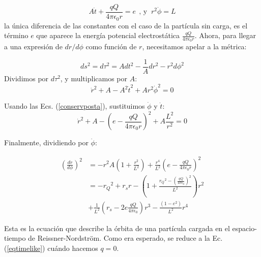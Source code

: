 \begin{equation}
    A\dot{t} + \frac{qQ}{4\pi\epsilon_0 r} = e\ \ \text{, y }\ r^2 \dot{\phi} = L
\label{conservposta}
\end{equation}
la única diferencia de las constantes con el caso de la partícula sin carga, es el término $e$ que aparece la energía potencial electrostática $\frac{qQ}{4\pi\epsilon_0 r}$. Ahora, para llegar a una expresión de $dr/d\phi$ como función de $r$, necesitamos apelar a la métrica:

\begin{equation}
    ds^2=d\tau^2=Adt^2 - \frac{1}{A}dr^2- r^2d\phi^2
\end{equation}
Dividimos por $d\tau^2$, y multiplicamos por $A$:
\begin{equation}
    \dot{r}^2 + A - A^2 \dot{t}^2 + A r^2 \dot{\phi}^2 =0
\end{equation}

Usando las Ecs. (\ref{conservposta}), sustituimos $\dot{\phi}$ y $\dot{t}$:
\begin{equation}
    \dot{r}^2 + A - \left(e-\frac{qQ}{4\pi\epsilon_0 r}\right)^2 + A \frac{L^2}{r^2} =0
\end{equation}

Finalmente, dividiendo por $\dot{\phi}$:

\begin{equation}
\begin{split}
    \left( \frac{dr}{d\phi} \right)^2 &= -r^2 A\left(1+\frac{r^2}{L^2}\right) + \frac{r^4}{L^2}\left( e - \frac{qQ}{4\pi\epsilon_0 r} \right)^2\\
    &=-{r_Q}^2 + r_s r - \left( 1 + \frac{{r_Q}^2 - \left(\frac{qQ}{4\pi\epsilon_0}\right)^2}{L^2} \right) r^2 \\ &+ \frac{1}{L^2} \left(r_s - 2e\frac{qQ}{4\pi\epsilon_0}\right)r^3 - \frac{(1-e^2)}{L^2}r^4
\end{split}
\label{eqtimelikecargado}
\end{equation}

Esta es la ecuación que describe la órbita de una partícula cargada en el espacio-tiempo de Reissner-Nordström. Como era esperado, se reduce a la Ec. (\ref{eqtimelike}) cuándo hacemos $q=0$.
